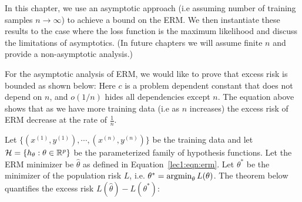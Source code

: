 \setcounter{section}{0}


In this chapter, we use an asymptotic approach (i.e assuming number of training samples $n \to \infty$) to achieve a bound on the ERM. We then instantiate these results to the case where the loss function is the maximum likelihood  and discuss the limitations of asymptotics. (In future chapters we will assume finite $n$ and provide a non-asymptotic analysis.)


For the asymptotic analysis of ERM, we would like to prove that excess risk is bounded as shown below:
Here $c$ is a problem dependent constant that does not depend on $n$, and $o(1/n)$ hides all dependencies except $n$. The equation above shows that as we have more training data (i.e as $n$ increases) the excess risk of ERM decrease at the rate of $\frac{1}{n}$.

Let $\{(x^{(1)},y^{(1)}), \cdots, (x^{(n)},y^{(n)})\}$ be the training data and let $\mathcal H = \{ h_\theta: \theta \in \mathbb R^p \}$ be the parameterized family of hypothesis functions. Let the ERM minimizer be $\hat{\theta}$ as defined in Equation~\eqref{lec1:eqn:erm}. Let $\theta^{*}$ be the minimizer
of the population risk $L$, i.e. $\theta^{*} = \operatorname*{\textup{argmin}}_\theta L(\theta)$. The theorem below quantifies the excess risk $L(\hat{\theta}) - L(\theta^{*})$:

